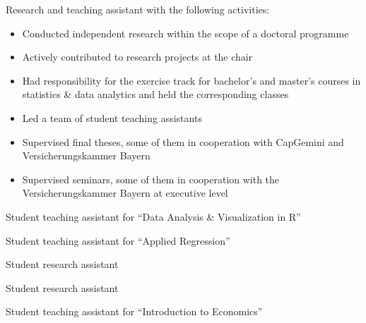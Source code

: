 \documentclass[10pt,a4paper,withhyper]{altacv}
\begin{document}
\begin{paracol}{2}


\newpage


Research and teaching assistant with the following activities:
\smallskip
\begin{itemize}
\item Conducted independent research within the scope of a doctoral programme
\item Actively contributed to research projects at the chair
\item Had responsibility for the exercise track for bachelor's and master's courses in statistics \& data analytics and held the corresponding classes
\item Led a team of student teaching assistants
\item Supervised final theses, some of them in cooperation with CapGemini and Versicherungskammer Bayern
\item Supervised seminars, some of them in cooperation with the Versicherungskammer Bayern at executive level
\end{itemize}

\divider

Student teaching assistant for ``Data Analysis \& Visualization in R''

\divider

Student teaching assistant for ``Applied Regression''

\divider

Student research assistant

\divider

Student research assistant

\divider

Student teaching assistant for ``Introduction to Economics''


\end{paracol}
\end{document}
